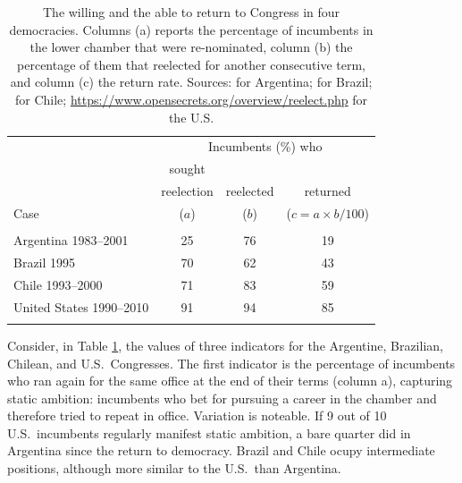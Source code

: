 \documentclass[letter,12pt]{article}
\newcommand{\mc}{\multicolumn}
\begin{document}
\begin{table}
  \centering
  \begin{tabular}{lccc}
                             & \mc{3}{c}{Incumbents (\%) who} \\ 
                             & sought      &             &            \\ [-.5ex]
                             & reelection  & reelected   & returned   \\ [-.5ex]
    Case                     & ($a$)       & ($b$)       & ($c=a\times b/100$) \\ \hline \\ [-1.25ex] 
    Argentina 1983--2001     & 25          &  76         &     19     \\
    Brazil 1995              & 70          &  62         &     43     \\
    Chile 1993--2000         & 71          &  83         &     59     \\
    United States 1990--2010 & 91          &  94         &     85     \\ \\ [-1.25ex] \hline
  \end{tabular}
  \caption{The willing and the able to return to Congress in four democracies. Columns (a) reports the percentage of incumbents in the lower chamber that were re-nominated, column (b) the percentage of them that reelected for another consecutive term, and column (c) the return rate. Sources: \citet[][:658]{jones.etal.amateurLegis.2002} for Argentina; \citet[][:415--6]{morgenstern.2002b} for Brazil; \citet{naviaIncumbency.2000} for Chile; \url{https://www.opensecrets.org/overview/reelect.php} for the U.S.}\label{T:retRate}
\end{table}

Consider, in Table \ref{T:retRate}, the values of three indicators for the Argentine, Brazilian, Chilean, and U.S.\ Congresses. The first indicator is the percentage of incumbents who ran again for the same office at the end of their terms (column a), capturing  static ambition: incumbents who bet for pursuing a career in the chamber and therefore tried to repeat in office. Variation is noteable. If 9 out of 10 U.S.\ incumbents regularly manifest static ambition, a bare quarter did in Argentina since the return to democracy. Brazil and Chile ocupy intermediate positions, although more similar to the U.S.\ than Argentina. 
\end{document}
